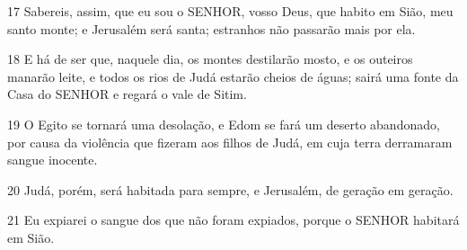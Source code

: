 \par 17 Sabereis, assim, que eu sou o SENHOR, vosso Deus, que habito em Sião, meu santo monte; e Jerusalém será santa; estranhos não passarão mais por ela.
\par 18 E há de ser que, naquele dia, os montes destilarão mosto, e os outeiros manarão leite, e todos os rios de Judá estarão cheios de águas; sairá uma fonte da Casa do SENHOR e regará o vale de Sitim.
\par 19 O Egito se tornará uma desolação, e Edom se fará um deserto abandonado, por causa da violência que fizeram aos filhos de Judá, em cuja terra derramaram sangue inocente.
\par 20 Judá, porém, será habitada para sempre, e Jerusalém, de geração em geração.
\par 21 Eu expiarei o sangue dos que não foram expiados, porque o SENHOR habitará em Sião.


